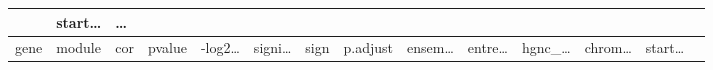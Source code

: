 \documentclass[
]{article}
\begin{document}
\begin{longtable}[]{@{}llllllllllllll@{}}
\begin{minipage}[b]{0.05\columnwidth}
\end{minipage} & \begin{minipage}[b]{0.05\columnwidth}\raggedright
start\ldots{}\strut
\end{minipage} & \begin{minipage}[b]{0.02\columnwidth}\raggedright
\ldots{}\strut
\end{minipage}\tabularnewline
\midrule
\endfirsthead
\toprule
\begin{minipage}[b]{0.05\columnwidth}\raggedright
gene\strut
\end{minipage} & \begin{minipage}[b]{0.04\columnwidth}\raggedright
module\strut
\end{minipage} & \begin{minipage}[b]{0.04\columnwidth}\raggedright
cor\strut
\end{minipage} & \begin{minipage}[b]{0.04\columnwidth}\raggedright
pvalue\strut
\end{minipage} & \begin{minipage}[b]{0.05\columnwidth}\raggedright
-log2\ldots{}\strut
\end{minipage} & \begin{minipage}[b]{0.05\columnwidth}\raggedright
signi\ldots{}\strut
\end{minipage} & \begin{minipage}[b]{0.03\columnwidth}\raggedright
sign\strut
\end{minipage} & \begin{minipage}[b]{0.05\columnwidth}\raggedright
p.adjust\strut
\end{minipage} & \begin{minipage}[b]{0.05\columnwidth}\raggedright
ensem\ldots{}\strut
\end{minipage} & \begin{minipage}[b]{0.05\columnwidth}\raggedright
entre\ldots{}\strut
\end{minipage} & \begin{minipage}[b]{0.05\columnwidth}\raggedright
hgnc\_\ldots{}\strut
\end{minipage} & \begin{minipage}[b]{0.05\columnwidth}\raggedright
chrom\ldots{}\strut
\end{minipage} & \begin{minipage}[b]{0.05\columnwidth}\raggedright
start\ldots{}\strut
\end{minipage} & \begin{minipage}[b]{0.02\columnwidth}\raggedright

\end{minipage}
\end{longtable}
\end{document}
